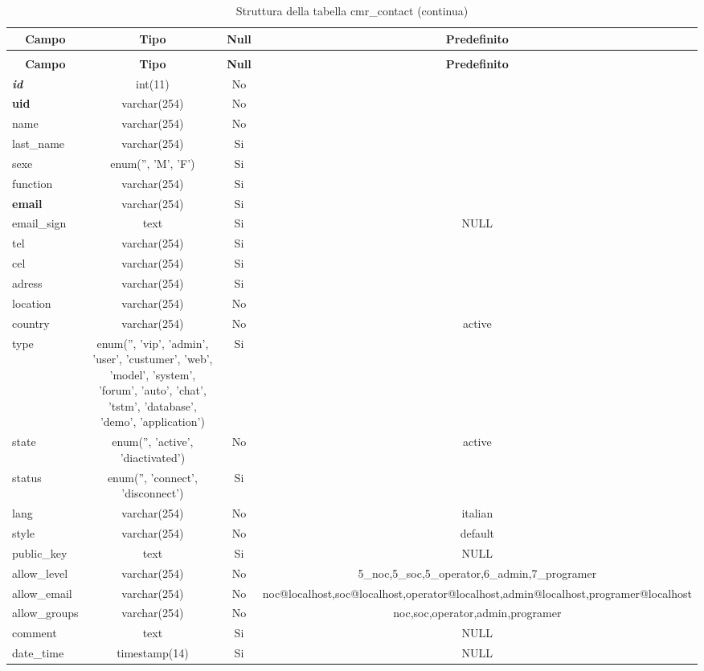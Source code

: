 %
%
 \begin{longtable}{|l|c|c|c|} 
 \caption{Struttura della tabella cmr\_contact} \label{tab:cmr_contact-structure} \\
 \hline \multicolumn{1}{|c|}{\textbf{Campo}} & \multicolumn{1}{|c|}{\textbf{Tipo}} & \multicolumn{1}{|c|}{\textbf{Null}} & \multicolumn{1}{|c|}{\textbf{Predefinito}} \\ \hline \hline
\endfirsthead
 \caption{Struttura della tabella cmr\_contact (continua)} \\ 
 \hline \multicolumn{1}{|c|}{\textbf{Campo}} & \multicolumn{1}{|c|}{\textbf{Tipo}} & \multicolumn{1}{|c|}{\textbf{Null}} & \multicolumn{1}{|c|}{\textbf{Predefinito}} \\ \hline \hline \endhead \endfoot \textbf{\textit{id}} & int(11) &  No  &  \\ \hline 
\textbf{uid} & varchar(254) &  No  &  \\ \hline 
name & varchar(254) &  No  &  \\ \hline 
last\_name & varchar(254) &  Si  &  \\ \hline 
sexe & enum('', 'M', 'F') &  Si  &  \\ \hline 
function & varchar(254) &  Si  &  \\ \hline 
\textbf{email} & varchar(254) &  Si  &  \\ \hline 
email\_sign & text &  Si  & NULL \\ \hline 
tel & varchar(254) &  Si  &  \\ \hline 
cel & varchar(254) &  Si  &  \\ \hline 
adress & varchar(254) &  Si  &  \\ \hline 
location & varchar(254) &  No  &  \\ \hline 
country & varchar(254) &  No  & active \\ \hline 
type & enum('', 'vip', 'admin', 'user', 'custumer', 'web', 'model', 'system', 'forum', 'auto', 'chat', 'tstm', 'database', 'demo', 'application') &  Si  &  \\ \hline 
state & enum('', 'active', 'diactivated') &  No  & active \\ \hline 
status & enum('', 'connect', 'disconnect') &  Si  &  \\ \hline 
lang & varchar(254) &  No  & italian \\ \hline 
style & varchar(254) &  No  & default \\ \hline 
public\_key & text &  Si  & NULL \\ \hline 
allow\_level & varchar(254) &  No  & 5\_noc,5\_soc,5\_operator,6\_admin,7\_programer \\ \hline 
allow\_email & varchar(254) &  No  & noc@localhost,soc@localhost,operator@localhost,admin@localhost,programer@localhost \\ \hline 
allow\_groups & varchar(254) &  No  & noc,soc,operator,admin,programer \\ \hline 
comment & text &  Si  & NULL \\ \hline 
date\_time & timestamp(14) &  Si  & NULL \\ \hline 
 \end{longtable}

